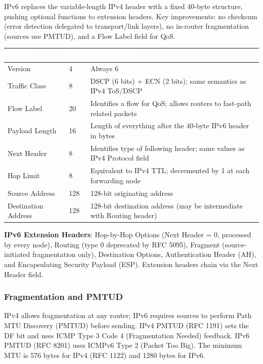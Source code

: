 \documentclass[11pt,letterpaper]{article}
\newcommand{\tableheader}[1]{\textbf{\sffamily\textcolor{white}{#1}}}
\begin{document}
IPv6 replaces the variable-length IPv4 header with a fixed 40-byte structure, pushing optional functions to extension headers. Key improvements: no checksum (error detection delegated to transport/link layers), no in-router fragmentation (sources use PMTUD), and a Flow Label field for QoS.

\begin{center}
\begin{tabularx}{\textwidth}{L{3.2cm}C{1.4cm}X}
\toprule
{}
\tableheader{Field} & \tableheader{Bits} & \tableheader{Description} \\
\midrule
Version & 4 & Always 6 \\
Traffic Class & 8 & DSCP (6 bits) + ECN (2 bits); same semantics as IPv4 ToS/DSCP \\
Flow Label & 20 & Identifies a flow for QoS; allows routers to fast-path related packets \\
Payload Length & 16 & Length of everything after the 40-byte IPv6 header in bytes \\
Next Header & 8 & Identifies type of following header; same values as IPv4 Protocol field \\
Hop Limit & 8 & Equivalent to IPv4 TTL; decremented by 1 at each forwarding node \\
Source Address & 128 & 128-bit originating address \\
Destination Address & 128 & 128-bit destination address (may be intermediate with Routing header) \\
\bottomrule
\end{tabularx}
\end{center}

\textbf{IPv6 Extension Headers}: Hop-by-Hop Options (Next Header = 0, processed by every node), Routing (type 0 deprecated by RFC 5095), Fragment (source-initiated fragmentation only), Destination Options, Authentication Header (AH), and Encapsulating Security Payload (ESP). Extension headers chain via the Next Header field.

\subsubsection{Fragmentation and PMTUD}

IPv4 allows fragmentation at any router; IPv6 requires sources to perform Path MTU Discovery (PMTUD) before sending. IPv4 PMTUD (RFC 1191) sets the DF bit and uses ICMP Type 3 Code 4 (Fragmentation Needed) feedback. IPv6 PMTUD (RFC 8201) uses ICMPv6 Type 2 (Packet Too Big). The minimum MTU is 576 bytes for IPv4 (RFC 1122) and 1280 bytes for IPv6.
\end{document}
